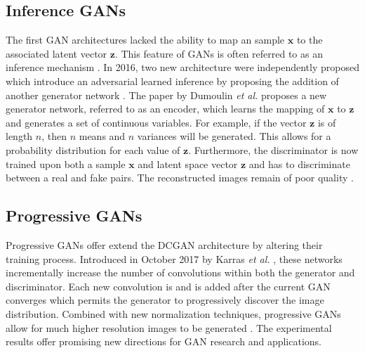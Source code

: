\documentclass[11pt]{article}
\begin{document}
\subsection{Inference GANs} \label{sec:inferencegan}
The first GAN architectures lacked the ability to map an sample $\bm{x}$ to the associated latent vector $\bm{z}$. This feature of GANs is often referred to as an inference mechanism \citep{2017arXiv171007035C}. In 2016, two new architecture were independently proposed which introduce an adversarial learned inference by proposing the addition of another generator network \citep{2016arXiv160509782D, 2016arXiv160600704D}. The paper by Dumoulin \textit{et al.} proposes a new generator network, referred to as an encoder, which learns the mapping of $\bm{x}$ to $\bm{z}$ and generates a set of continuous variables. For example, if the vector $\bm{z}$ is of length $n$, then $n$ means and $n$ variances will be generated. This allows for a probability distribution for each value of $\bm{z}$. Furthermore, the discriminator is now trained upon both a sample $\bm{x}$ and latent space vector $\bm{z}$ and has to discriminate between a real and fake pairs. The reconstructed images remain of poor quality \citep{2017arXiv171007035C}.

\subsection{Progressive GANs}
Progressive GANs offer extend the DCGAN architecture by altering their training process. Introduced in October 2017 by Karras \textit{et al.} \citep{2017arXiv171010196K}, these networks incrementally increase the number of convolutions within both the generator and discriminator. Each new convolution is  and is added after the current GAN converges which permits the generator to progressively discover the image distribution. Combined with new normalization techniques, progressive GANs allow for much higher resolution images to be generated \citep{2017arXiv171010196K}. The experimental results offer promising new directions for GAN research and applications.
\end{document}
